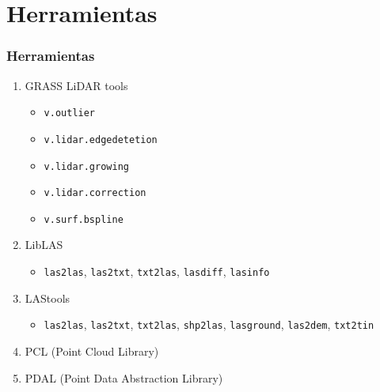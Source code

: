 \section{Herramientas}
\begin{frame}
    \frametitle{Herramientas}
    \begin{enumerate}
        \item GRASS LiDAR tools 
	\begin{itemize}
            \item \texttt{v.outlier}
            \item \texttt{v.lidar.edgedetetion}
            \item \texttt{v.lidar.growing}
            \item \texttt{v.lidar.correction}
            \item \texttt{v.surf.bspline}
	\end{itemize}
        \item LibLAS
	\begin{itemize}
            \item \texttt{las2las}, \texttt{las2txt}, \texttt{txt2las}, \texttt{lasdiff}, \texttt{lasinfo} 
	\end{itemize}
        \item LAStools
	\begin{itemize}
            \item \texttt{las2las}, \texttt{las2txt}, \texttt{txt2las},
                \texttt{shp2las}, \texttt{lasground}, \texttt{las2dem}, \texttt{txt2tin}
	\end{itemize}
        \item PCL (Point Cloud Library)
        \item PDAL (Point Data Abstraction Library)
    \end{enumerate}
\end{frame}
